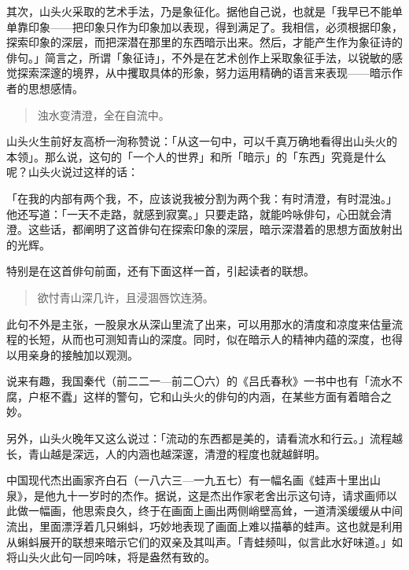 {    其次，山头火采取的艺术手法，乃是象征化。据他自己说，也就是「我早已不能单单靠印象——把印象只作为印象加以表现，得到满足了。我相信，必须根据印象，探索印象的深层，而把深潜在那里的东西暗示出来。然后，才能产生作为象征诗的俳句。」\footnotemark[4]简言之，所谓「象征诗」，不外是在艺术创作上采取象征手法，以锐敏的感觉探索深邃的境界，从中攫取具体的形象，努力运用精确的语言来表现——暗示作者的思想感情。


    \begin{quote}        浊水变清澄，全在自流中。
    \end{quote}

    山头火生前好友高桥一洵称赞说：「从这一句中，可以千真万确地看得出山头火的本领」\footnotemark[5]。那么说，这句的「一个人的世界」和所「暗示」的「东西」究竟是什么呢？山头火说过这样的话：


    「在我的内部有两个我，不，应该说我被分割为两个我：有时清澄，有时混浊。」他还写道：「一天不走路，就感到寂寞。」只要走路，就能吟咏俳句，心田就会清澄\footnotemark[6]。这些话，都阐明了这首俳句在探索印象的深层，暗示深潜着的思想方面放射出的光辉。


    特别是在这首俳句前面，还有下面这样一首，引起读者的联想。

    \begin{quote}
        欲忖青山深几许，且浸涸唇饮连漪。
    \end{quote}

    此句不外是主张，一股泉水从深山里流了出来，可以用那水的清度和凉度来估量流程的长短，从而也可测知青山的深度。同时，似在暗示人的精神内蕴的深度，也得以用亲身的接触加以观测。

    说来有趣，我国秦代（前二二一—前二〇六）的《吕氏春秋》一书中也有「流水不腐，户枢不蠹」这样的警句，它和山头火的俳句的内涵，在某些方面有着暗合之妙。

    另外，山头火晚年又这么说过：「流动的东西都是美的，请看流水和行云。」流程越长，青山越是深远，人的内涵也越深邃，清澄的程度也就越鲜明。

    中国现代杰出画家齐白石（一八六三—一九五七）有一幅名画《蛙声十里出山泉》，是他九十一岁时的杰作。据说，这是杰出作家老舍出示这句诗，请求画师以此做一幅画，他思索良久，终于在画面上画出两侧峭壁高耸，一道清溪缓缓从中间流出，里面漂浮着几只蝌蚪，巧妙地表现了画面上难以描摹的蛙声。这也就是利用从蝌蚪展开的联想来暗示它们的双亲及其叫声。「青蛙频叫，似言此水好味道。」如将山头火此句一同吟味，将是盎然有致的。

}

